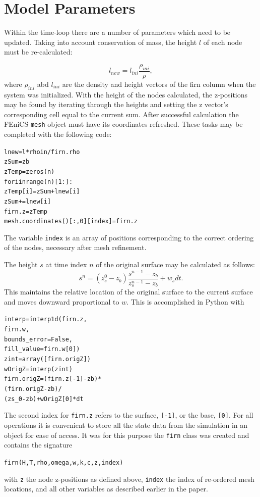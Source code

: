 \documentclass{article}%
\begin{document}
\section{Model Parameters}

Within the time-loop there are a number of parameters which need to be updated.  Taking into account conservation of mass, the height $l$ of each node must be re-calculated:\par
  $$l_{new} = l_{ini} \frac{\rho_{ini}}{\rho},$$
where $\rho_{ini}$ abd $l_{ini}$ are the density and height vectors of the firn column when the system was initialized.  With the height of the nodes calculated, the z-positions may be found by iterating through the heights and setting the z vector's corresponding cell equal to the current sum.  After successful calculation the FEniCS \texttt{mesh} object must have its coordinates refreshed.  These tasks may be completed with the following code:\par
\footnotesize
\begin{alltt}
lnew     = l*rhoin / firn.rho
zSum     = zb
zTemp    = zeros(n)
for i in range(n)[1:]:
  zTemp[i] = zSum + lnew[i]
  zSum    += lnew[i]
firn.z  = zTemp
mesh.coordinates()[:,0][index] = firn.z
\end{alltt}
\normalsize
The variable \texttt{index} is an array of positions corresponding to the correct ordering of the nodes, necessary after mesh refinement.  

The height $s$ at time index $n$ of the original surface may be calculated as follows:
  $$s^{n} = (z_s^0 - z_b) \frac{s^{n-1} - z_b}{z_s^{n-1} - z_b} + w_s dt.$$
This maintains the relative location of the original surface to the current surface and moves downward proportional to $w$.  This is accomplished in Python with\par
\footnotesize
\begin{alltt}
interp     = interp1d(firn.z, 
                      firn.w,
                      bounds_error=False,
                      fill_value=firn.w[0])
zint       = array([firn.origZ])
wOrigZ     = interp(zint)
firn.origZ = (firn.z[-1] - zb) * 
             (firn.origZ - zb) / 
             (zs_0 - zb) + wOrigZ[0] * dt
\end{alltt}
\normalsize
The second index for \texttt{firn.z} refers to the surface, \texttt{[-1]}, or the base, \texttt{[0]}.
For all operations it is convenient to store all the state data from the simulation in an object for ease of access.  It was for this purpose the \texttt{firn} class was created and contains the signature\par 
\footnotesize
\begin{alltt}
firn(H, T, rho, omega, w, k, c, z, index)
\end{alltt}
\normalsize
with \texttt{z} the node z-positions as defined above, \texttt{index} the index of re-ordered mesh locations, and all other variables as described earlier in the paper.
\end{document}
